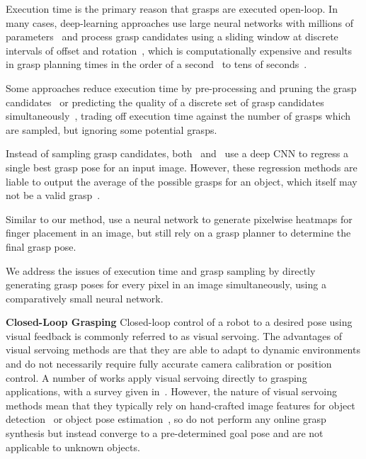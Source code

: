 \documentclass[conference]{IEEEtran}
\begin{document}
Execution time is the primary reason that grasps are executed open-loop.  In many cases, deep-learning approaches use large neural networks with millions of parameters~\cite{Johns2016DeepUncertainty, Mahler2017Dex2, Pinto2016SupersizingHours} and process grasp candidates using a sliding window at discrete intervals of offset and rotation~\cite{Lenz2015DeepGrasps, Pinto2016SupersizingHours}, which is computationally expensive and results in grasp planning times in the order of a second~\cite{Mahler2017Dex2} to tens of seconds~\cite{Lenz2015DeepGrasps}.  

Some approaches reduce execution time by pre-processing and pruning the grasp candidates~\cite{Lenz2015DeepGrasps, Wang2016RobotNetworks} or predicting the quality of a discrete set of grasp candidates simultaneously~\cite{Johns2016DeepUncertainty, Pinto2016SupersizingHours}, trading off execution time against the number of grasps which are sampled, but ignoring some potential grasps.  

Instead of sampling grasp candidates, both~\cite{Kumra2017RoboticNetworks} and~\cite{Redmon2015Real-timeNetworks} use a deep CNN to regress a single best grasp pose for an input image. However, these regression methods are liable to output the average of the possible grasps for an object, which itself may not be a valid grasp~\cite{Redmon2015Real-timeNetworks}. 

Similar to our method, \citet{varley2015generating} use a neural network to generate pixelwise heatmaps for finger placement in an image, but still rely on a grasp planner to determine the final grasp pose.

We address the issues of execution time and grasp sampling by directly generating grasp poses for every pixel in an image simultaneously, using a comparatively small neural network. 


\textbf{Closed-Loop Grasping}
Closed-loop control of a robot to a desired pose using visual feedback is commonly referred to as visual servoing.  The advantages of visual servoing methods are that they are able to adapt to dynamic environments and do not necessarily require fully accurate camera calibration or position control.  A number of works apply visual servoing directly to grasping applications, with a survey given in~\cite{kragic2002survey}.  However, the nature of visual servoing methods mean that they typically rely on hand-crafted image features for object detection~\cite{kober2012playing, Vahrenkamp2008VisualTasks} or object pose estimation~\cite{Horaud1998VisuallyGrasping}, so do not perform any online grasp synthesis but instead converge to a pre-determined goal pose and are not applicable to unknown objects.  
\end{document}
